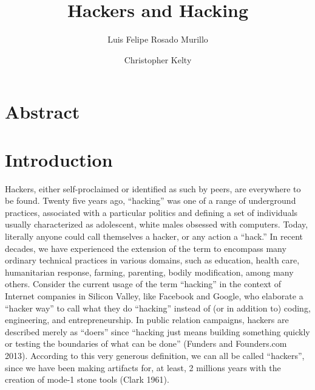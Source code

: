 \documentclass[10pt,letter,oneside]{scrartcl}
\author[1]{Luis Felipe Rosado Murillo}
\author[2]{Christopher Kelty}
\affil[1]{Berkman Center for Internet and Society, Harvard University}
\affil[2]{Institute for Society and Genetics, Department of 
          Anthropology, and Department of Information Studies, UCLA}
\title{Hackers and Hacking}
\date{}
\begin{document}
 \maketitle 

\section{Abstract} 

\doublespacing 




\section{Introduction}

Hackers, either self-proclaimed or identified as such by peers,  are everywhere
to be found.  Twenty five years ago, ``hacking'' was one of a range of underground 
practices, associated with a particular politics and defining a set of individuals 
usually characterized as adolescent, white males obsessed with computers.  Today, 
literally anyone could call themselves a hacker, or any action a ``hack.'' In 
recent decades, we have experienced the extension of the term to encompass 
many ordinary technical practices in various domains, such as education, health 
care, humanitarian response, farming, parenting, bodily modification, among many 
others.  Consider the current usage of the term ``hacking'' in the context of 
Internet companies in Silicon Valley, like Facebook and Google, who elaborate 
a ``hacker way'' to call what they do ``hacking'' instead of (or in addition to) 
coding, engineering, and entrepreneurship.  In public relation campaigns, 
hackers are described merely as ``doers'' since ``hacking just means building 
something quickly or testing the boundaries of what can be done'' (Funders and
Founders.com 2013).  According to this very generous definition, we can all 
be called ``hackers'', since we have been making artifacts for, at least, 2 
millions years with the creation of mode-1 stone tools (Clark 1961).
\end{document}
